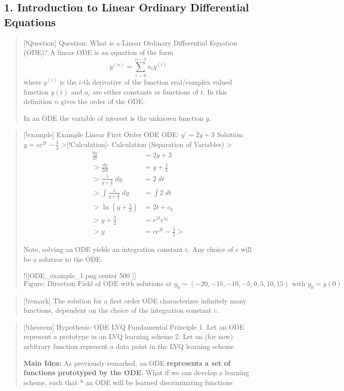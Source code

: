 \documentclass[
]{article}
\author{}
\date{}
\begin{document}
\subsection{1. Introduction to Linear Ordinary Differential
Equations}\label{introduction-to-linear-ordinary-differential-equations}

\begin{quote}
{[}!Question{]} Question: What is a Linear Ordinary Differential
Equation (ODE)? A linear ODE is an equation of the form
\[y^{(n)} =\sum_{i=0}^{n-1} a_{i}y^{(i)}\] where \(y^{(i)}\) is the
\(i\)-th derivative of the function real/complex valued function
\(y(t)\) and \(a_i\) are either constants or functions of \(t\). In this
definition \(n\) gives the order of the ODE.

In an ODE the variable of interest is the unknown function \(y\).
\end{quote}

\begin{quote}
{[}!example{]} Example Linear First Order ODE ODE: \(y'=2y+3\) Solution:
\(y = ce^{2t}-\frac32\) \textgreater{[}!Calculation{]}- Calculation
(Separation of Variables)
\textgreater{}\[\begin{align} \frac{dy}{dt} &= 2y + 3 \\ 
>\frac{dy}{2dt} &= y + \frac{3}{2} \\
>\frac{1}{y+\frac{3}{2}}\; dy&= 2\; dt \\
>\int \frac{1}{y+\frac32} \; dy &= \int 2 \; dt \\
>\ln\left(y+\frac32\right) &= 2t +c_0\\
>y + \frac32&=e^{2t} e^{c_0}\\
>y &= ce^{2t}-\frac32
>\end{align}\]

Note, solving an ODE yields an integration constant \(c\). Any choice of
\(c\) will be a solution to the ODE.

!{[}{[}ODE\_example\_1.png \textbar{} center \textbar{} 500 {]}{]}
\[\text{Figure: Direction Field of ODE with solutions at } y_{0}=(-20, -15, -10, -5, 0, 5, 10, 15) \text{ with } y_{0} = y(0)\]
\end{quote}

\begin{quote}
{[}!remark{]} The solution for a first order ODE characterizes
infinitely many functions, dependent on the choice of the integration
constant \(c\).
\end{quote}

\begin{quote}
{[}!theorem{]} Hypothesis: ODE LVQ Fundamental Principle 1. Let an ODE
represent a prototype in an LVQ learning scheme 2. Let an (for now)
arbitrary function represent a data point in the LVQ learning scheme

\textbf{Main Idea:} As previously remarked, an ODE \textbf{represents a
set of functions prototyped by the ODE}. What if we can develop a
learning scheme, such that * an ODE will be learned discriminating
functions
\end{quote}
\end{document}
